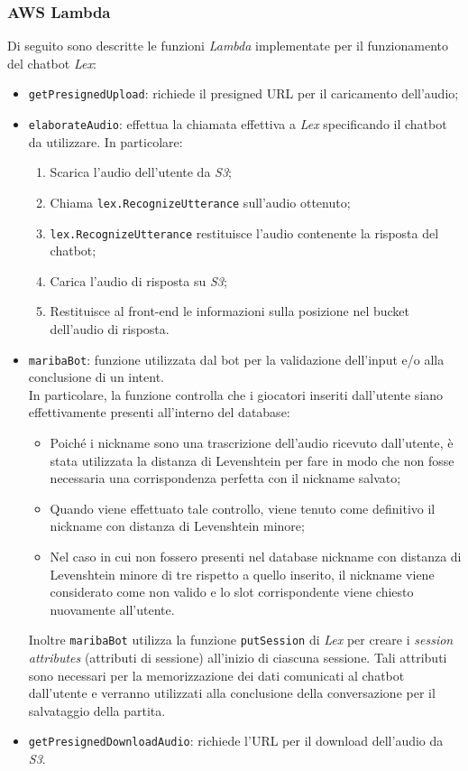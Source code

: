 		\subsubsection{AWS Lambda}
		Di seguito sono descritte le funzioni \emph{Lambda} implementate per il funzionamento del \gls{chatbot} \emph{Lex}:
		\begin{itemize}
			\item \texttt{getPresignedUpload}: richiede il presigned URL per il caricamento dell'audio;
			
			\item \texttt{elaborateAudio}: effettua la chiamata effettiva a \emph{Lex} specificando il \gls{chatbot} da utilizzare. In particolare:
			\begin{enumerate}
				\item Scarica l'audio dell'utente da \emph{S3};
				\item Chiama \texttt{lex.RecognizeUtterance} sull'audio ottenuto;
				\item \texttt{lex.RecognizeUtterance} restituisce l'audio contenente la risposta del \gls{chatbot};
				\item Carica l'audio di risposta su \emph{S3};
				\item Restituisce al front-end le informazioni sulla posizione nel bucket dell'audio di risposta.
			\end{enumerate}
			
			\item \texttt{maribaBot}: funzione utilizzata dal bot per la validazione dell'input e/o alla conclusione di un intent. \\
			In particolare, la funzione controlla che i giocatori inseriti dall'utente siano effettivamente presenti all'interno del database:
			\begin{itemize}
				\item Poiché i nickname sono una trascrizione dell'audio ricevuto dall'utente, è stata utilizzata la 
				\gls{distanza di Levenshtein} per fare in modo che non fosse necessaria una corrispondenza perfetta 
				con il nickname salvato;
				\item Quando viene effettuato tale controllo, viene tenuto come definitivo il nickname con \gls{distanza di Levenshtein} minore;
				\item  Nel caso in cui non fossero presenti nel database nickname con \gls{distanza di Levenshtein} minore di tre rispetto a quello inserito, il nickname viene considerato come non valido e lo slot corrispondente viene chiesto nuovamente all'utente.
			\end{itemize}
			Inoltre \texttt{maribaBot} utilizza la funzione \texttt{putSession} di \emph{Lex} per creare i \emph{session attributes} (attributi di sessione) all'inizio di ciascuna sessione. Tali attributi sono necessari per la memorizzazione dei dati comunicati al \gls{chatbot} dall'utente e verranno utilizzati alla conclusione della conversazione per il salvataggio della partita.
		
			\item \texttt{getPresignedDownloadAudio}: richiede l'URL per il download dell'audio da \emph{S3}.
			
		\end{itemize}
		
